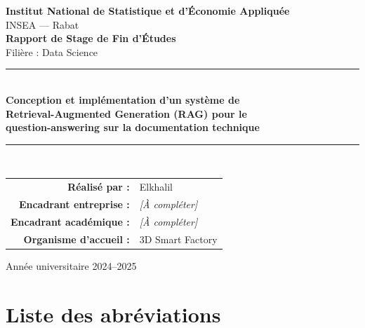 \documentclass[12pt,a4paper,oneside]{report}
\begin{document}
\begin{titlepage}
\centering
\vspace*{1cm}

{\large \textbf{Institut National de Statistique et d'Économie Appliquée}}\\[0.3cm]
{\large INSEA --- Rabat}\\[1.5cm]

{\Large \textbf{Rapport de Stage de Fin d'Études}}\\[0.3cm]
{\large Filière : Data Science}\\[2cm]

\rule{\textwidth}{1.5pt}\\[0.5cm]
{\LARGE \textbf{Conception et implémentation d'un système de \\ Retrieval-Augmented Generation (RAG) pour le \\ question-answering sur la documentation technique}}\\[0.5cm]
\rule{\textwidth}{1.5pt}\\[2cm]

{\large
\begin{tabular}{rl}
\textbf{Réalisé par :}   & Elkhalil \\[0.3cm]
\textbf{Encadrant entreprise :} & \textit{[À compléter]} \\[0.3cm]
\textbf{Encadrant académique :} & \textit{[À compléter]} \\[0.3cm]
\textbf{Organisme d'accueil :}  & 3D Smart Factory \\[0.3cm]
\end{tabular}
}

\vfill
{\large Année universitaire 2024--2025}

\end{titlepage}

\tableofcontents
\newpage
\listoffigures
\newpage
\listoftables
\newpage

\chapter*{Liste des abréviations}
\end{document}
